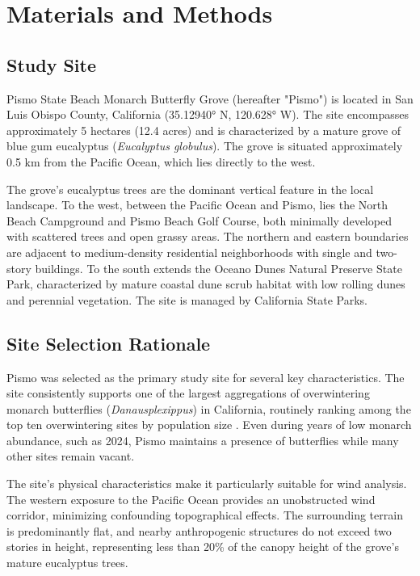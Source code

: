 \section{Materials and Methods}
\subsection{Study Site}
Pismo State Beach Monarch Butterfly Grove (hereafter "Pismo") is located in San Luis Obispo County, California (35.12940° N, 120.628° W). The site encompasses approximately 5 hectares (12.4 acres) and is characterized by a mature grove of blue gum eucalyptus (\textit{Eucalyptus globulus}). The grove is situated approximately 0.5 km from the Pacific Ocean, which lies directly to the west.

The grove's eucalyptus trees are the dominant vertical feature in the local landscape. To the west, between the Pacific Ocean and Pismo, lies the North Beach Campground and Pismo Beach Golf Course, both minimally developed with scattered trees and open grassy areas. The northern and eastern boundaries are adjacent to medium-density residential neighborhoods with single and two-story buildings. To the south extends the Oceano Dunes Natural Preserve State Park, characterized by mature coastal dune scrub habitat with low rolling dunes and perennial vegetation. The site is managed by California State Parks.


\subsection{Site Selection Rationale}
Pismo was selected as the primary study site for several key characteristics. The site consistently supports one of the largest aggregations of overwintering monarch butterflies (\textit{Danausplexippus}) in California, routinely ranking among the top ten overwintering sites by population size \autocite{westernmonarchcount2023}. Even during years of low monarch abundance, such as 2024, Pismo maintains a presence of butterflies while many other sites remain vacant.

The site's physical characteristics make it particularly suitable for wind analysis. The western exposure to the Pacific Ocean provides an unobstructed wind corridor, minimizing confounding topographical effects. The surrounding terrain is predominantly flat, and nearby anthropogenic structures do not exceed two stories in height, representing less than 20\% of the canopy height of the grove's mature eucalyptus trees.

